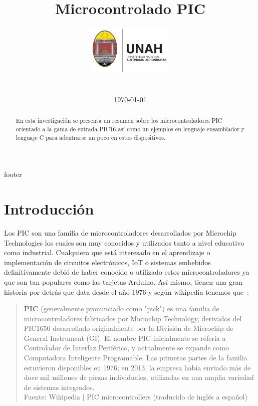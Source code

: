 \documentclass[conference]{IEEEtran}
\title{Microcontrolado PIC}
\author{
    \includegraphics[width = 40mm]{images/logo-unah}\\[8ex]
    \IEEEauthorblockN{Tobias Briones}
    \IEEEauthorblockN{tobias.briones@unah.hn}
    \IEEEauthorblockA{\textit{Universidad Nacional Autónoma de Honduras} \\
    \textit{Ingeniería de Sistemas} \\
    \textit{I PAC 2022} \\
    \textit{IS911-MICROPROCESADORES}} \\\vspace*{20pt} \normalsize  \\
    \today
}
\begin{document}
    \maketitle

    \begin{abstract}
        En esta investigación se presenta un resumen sobre los
        microcontroladores PIC orientado a la gama de entrada PIC16 así como
        un ejemplos en lenguaje ensamblador y lenguaje C para adentrarse un
        poco en estos dispositivos.
    \end{abstract}

    \tableofcontents

    {footer}

    \section{Introducción}

    Los PIC son una familia de microcontroladores desarrollados por Microchip
    Technologies \cite{microchip-technology-inc-2013} los cuales son muy
    conocidos y utilizados tanto a nivel educativo como industrial.
    Cualquiera que está interesado en el aprendizaje o implementación de
    circuitos electrónicos, IoT o sistemas embebidos definitivamente debió de
    haber conocido o utilizado estos microcontroladores ya que son tan
    populares como las tarjetas Arduino. Así mismo, tienen una gran historia
    por detrás que data desde el año $1976$ y según wikipedia tenemos que~\cite{wikipedia-pic-2022}:

    \bigbreak

    \begin{quote}
        \textbf{PIC} (generalmente pronunciado como "pick") es una familia de
        microcontroladores fabricados por Microchip Technology, derivados del
        PIC1650 desarrollado originalmente por la División de Microchip de
        General Instrument (GI). El nombre PIC inicialmente se refería a
        Controlador de Interfaz Periférico, y actualmente se expande como
        Computadora Inteligente Programable. Las primeras partes de la
        familia estuvieron disponibles en 1976; en 2013, la empresa había
        enviado más de doce mil millones de piezas individuales, utilizadas
        en una amplia variedad de sistemas integrados.
        \\
        \small Fuente: Wikipedia $\mid$ PIC microcontrollers (traducido de
        inglés a español) \cite{wikipedia-pic-2022}
    \end{quote}
\end{document}
